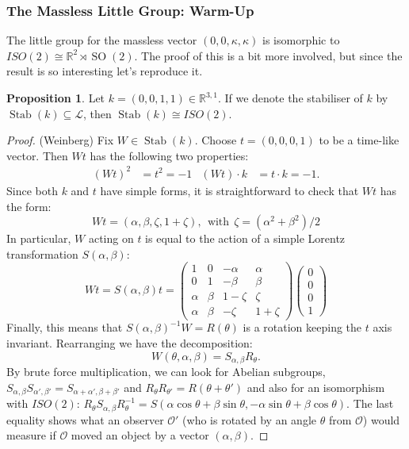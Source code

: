 \documentclass[10pt]{article}
\newcommand{\bR}{\mathbb{R}}
\newcommand{\ms}{\mathscr}
\theoremstyle{plain}
\theoremstyle{definition}
\newtheorem{prop}{Proposition}
\theoremstyle{remark}
\DeclareMathOperator{\SO}{SO}
\DeclareMathOperator{\Stab}{Stab}
\def\seq{\subseteq}
\def\bP{\begin{pmatrix}}
\def\eP{\end{pmatrix}}
\begin{document}
\subsubsection{The Massless Little Group: Warm-Up}
The little group for the massless vector $(0,0,\kappa,\kappa)$ is
isomorphic to $ISO(2)\cong \bR^2\rtimes \SO(2)$. The proof of this is
a bit more involved, but since the result is so interesting let's
reproduce it.

\begin{prop} 
    Let $k = (0,0,1,1)\in\bR^{3,1}$. If we denote the stabiliser of
    $k$ by $\Stab(k)\seq\ms L$, then $\Stab(k)\cong ISO(2)$.
\end{prop}
\begin{proof}(Weinberg)
    Fix $W\in \Stab(k)$.  Choose $t = (0,0,0,1)$ to be a time-like
    vector. Then $Wt$ has the following two properties:
    \begin{align*}
        (Wt)^2 &= t^2 = -1 &
        (Wt)\cdot k &= t\cdot k = -1.
    \end{align*}
    Since both $k$ and $t$ have simple forms, it is straightforward to
    check that $Wt$ has the form:
    \[ Wt = (\alpha,\beta,\zeta,1+\zeta),\ \ \text{with}\ \
    \zeta=(\alpha^2+\beta^2)/2\]
    In particular, $W$ acting on $t$ is equal to the action of a
    simple Lorentz transformation $S(\alpha,\beta)$:
    \[ Wt = S(\alpha,\beta) t = 
        \bP
        1 & 0     & -\alpha & \alpha \\
        0 & 1     & -\beta  & \beta  \\
   \alpha & \beta & 1-\zeta & \zeta  \\
   \alpha & \beta & -\zeta  & 1+\zeta
        \eP
    \bP0\\0\\0\\1\eP\]
    Finally, this means that $S(\alpha,\beta)^{-1}W = R(\theta)$ is a
    rotation keeping the $t$ axis invariant. Rearranging we have the
    decomposition:
    \[W(\theta,\alpha,\beta)=S_{\alpha,\beta}R_\theta.\]
    By brute force multiplication, we can look for Abelian subgroups,
    $S_{\alpha,\beta}S_{\alpha',\beta'} = S_{\alpha+\alpha',\beta+
    \beta'}$ and $R_\theta R_{\theta'}=R(\theta+\theta')$
    and also for an isomorphism with $ISO(2)$: $R_\theta S_{\alpha,
    \beta} R^{-1}_\theta = S(\alpha\cos\theta +\beta\sin\theta,
    -\alpha\sin\theta+\beta\cos\theta)$.  The last equality shows what
    an observer $\ms O'$ (who is rotated by an angle $\theta$ from
    $\ms O$) would measure if $\ms O$ moved an object by a vector
    $(\alpha,\beta)$.
\end{proof}
\end{document}
